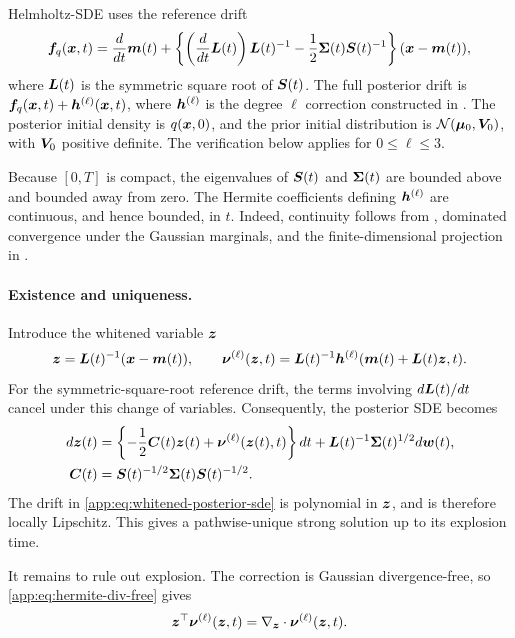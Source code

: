 Helmholtz-SDE uses the reference drift
\begin{equation*}
    \boldsymbol{f}_q(\boldsymbol{x},t)  = \frac{d}{dt}\boldsymbol{m}(t) + \left\{ \left(\frac{d}{dt}\boldsymbol{L}(t)\right)\boldsymbol{L}(t)^{-1} -\frac{1}{2}\boldsymbol{\Sigma}(t)\boldsymbol{S}(t)^{-1} \right\} (\boldsymbol{x}-\boldsymbol{m}(t)),
\end{equation*}
where $\boldsymbol{L}(t)$ is the symmetric square root of $\boldsymbol{S}(t)$.
The full posterior drift is $\boldsymbol{f}_q(\boldsymbol{x},t)+\boldsymbol{h}^{(\ell)}(\boldsymbol{x},t)$, where $\boldsymbol{h}^{(\ell)}$ is the degree $\ell$ correction constructed in .  
The posterior initial density is $q(\boldsymbol{x},0)$, and the prior initial distribution is $\mathcal{N}(\boldsymbol{\mu}_0,\boldsymbol{V}_0)$, with $\boldsymbol{V}_0$ positive definite.
The verification below applies for $0 \leq \ell \leq 3$.

Because $[0,T]$ is compact, the eigenvalues of $\boldsymbol{S}(t)$ and $\boldsymbol{\Sigma}(t)$ are bounded above and bounded away from zero.  
The Hermite coefficients defining $\boldsymbol{h}^{(\ell)}$ are continuous, and hence bounded, in $t$.  
Indeed, continuity follows from , dominated convergence under the Gaussian marginals, and the finite-dimensional projection in .

\paragraph{Existence and uniqueness.}
Introduce the whitened variable $\boldsymbol{z}$
\begin{equation*}
    \boldsymbol{z}=\boldsymbol{L}(t)^{-1}(\boldsymbol{x}-\boldsymbol{m}(t)), \qquad \boldsymbol{\nu}^{(\ell)}(\boldsymbol{z},t) =\boldsymbol{L}(t)^{-1} \boldsymbol{h}^{(\ell)}(\boldsymbol{m}(t)+\boldsymbol{L}(t)\boldsymbol{z},t).
\end{equation*}
For the symmetric-square-root reference drift, the terms involving $d\boldsymbol{L}(t)/dt$ cancel under this change of variables. 
Consequently, the posterior SDE becomes
\begin{equation}
\label{app:eq:whitened-posterior-sde}
\begin{aligned}
    d\boldsymbol{z}(t) &= \left\{ -\frac{1}{2}\boldsymbol{C}(t)\boldsymbol{z}(t) +\boldsymbol{\nu}^{(\ell)}(\boldsymbol{z}(t),t) \right\}dt+\boldsymbol{L}(t)^{-1}\boldsymbol{\Sigma}(t)^{1/2}d\boldsymbol{w}(t),\\\boldsymbol{C}(t) &=\boldsymbol{S}(t)^{-1/2}\boldsymbol{\Sigma}(t)\boldsymbol{S}(t)^{-1/2}.
\end{aligned}
\end{equation}
The drift in \cref{app:eq:whitened-posterior-sde} is polynomial in $\boldsymbol{z}$, and is therefore locally Lipschitz.  
This gives a pathwise-unique strong solution up to its explosion time.

It remains to rule out explosion.
The correction is Gaussian divergence-free, so \cref{app:eq:hermite-div-free} gives
\begin{equation*}
    \boldsymbol{z}^\top\boldsymbol{\nu}^{(\ell)}(\boldsymbol{z},t)=\nabla_{\boldsymbol{z}}\cdot\boldsymbol{\nu}^{(\ell)}(\boldsymbol{z},t).
\end{equation*}


